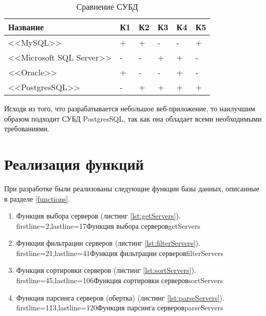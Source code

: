 \captionsetup{justification=raggedleft,singlelinecheck=off}
\begin{table}[H]
    \centering
	\caption{Сравнение СУБД}
    \label{tbl:compare_subd}
	\begin{tabular}{|l|l|l|l|l|l|}
        \hline
        \textbf{Название} & \textbf{К1} & \textbf{К2} & \textbf{К3} & \textbf{К4} & \textbf{К5} \\ \hline

        <<MySQL>>                   & + & + & - & - & + \\ \hline
        <<Microsoft SQL Server>>    & - & - & + & + & - \\ \hline
        <<Oracle>>                  & + & - & - & + & - \\ \hline
        <<PostgresSQL>>             & - & + & + & + & + \\ \hline

    \end{tabular}
\end{table}

Исходя из того, что разрабатывается небольшое веб-приложение, то наилучшим образом подходит СУБД PostgresSQL, так как она обладает всеми необходимыми требованиями.


\section{Реализация функций}

При разработке были реализованы следующие функции базы данных, описанные в разделе \ref{functions}.

\begin{enumerate}
    \item Функция выбора серверов (листинг \ref{lst:getServers}).
            {firstline=2,lastline=17}{Функция выбора серверов}{getServers}{}

    \item Функция фильтрации серверов (листинг \ref{lst:filterServers}).
            {firstline=21,lastline=41}{Функция фильтрации серверов}{filterServers}{}

    \item Функция сортировки серверов (листинг \ref{lst:sortServers}).
            {firstline=45,lastline=106}{Функция сортировки серверов}{sortServers}{}

    \item Функция парсинга серверов (обертка) (листинг \ref{lst:parseServers}).
            {firstline=113,lastline=120}{Функция парсинга серверов}{parseServers}{}
\end{enumerate}


